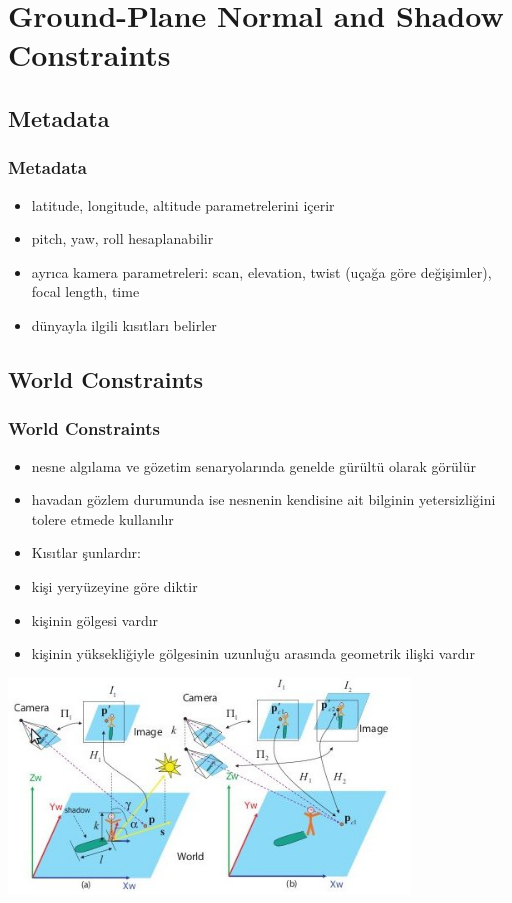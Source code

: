 \documentclass{beamer}
\begin{document}
\section{Ground-Plane Normal and Shadow Constraints}

\subsection{Metadata}

\begin{frame}
	\frametitle{Metadata}

	\begin{itemize}
		\item latitude, longitude, altitude parametrelerini içerir
		\item pitch, yaw, roll hesaplanabilir
		\item ayrıca kamera parametreleri: scan, elevation, twist (uçağa göre
			  değişimler), focal length, time
		\item dünyayla ilgili kısıtları belirler
	\end{itemize}
\end{frame}

\subsection{World Constraints}

\begin{frame}
	\frametitle{World Constraints}

	\begin{itemize}
		\item nesne algılama ve gözetim senaryolarında genelde gürültü olarak görülür
		\item havadan gözlem durumunda ise nesnenin kendisine ait bilginin
			  yetersizliğini tolere etmede kullanılır
		\item Kısıtlar şunlardır:
		\item kişi yeryüzeyine göre diktir
		\item kişinin gölgesi vardır
		\item kişinin yüksekliğiyle gölgesinin uzunluğu arasında geometrik
		ilişki vardır
	\end{itemize}
\end{frame}

\begin{frame}
	\includegraphics[width=0.8\textwidth]{img/fig2.jpg}
\end{frame}
\end{document}
